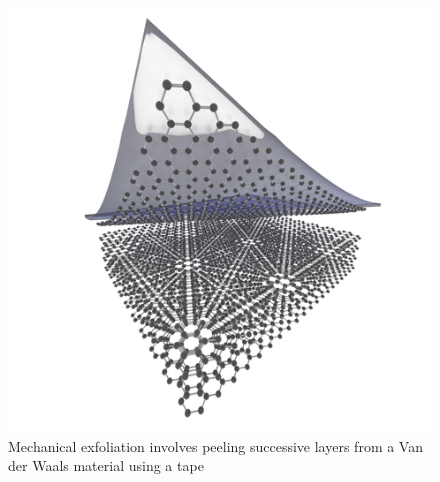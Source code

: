 \documentclass[12pt,a4paper]{report}
\begin{document}
\begin{figure}
  \centering
  \includegraphics[scale=0.3]{2.1.1.png}
  \caption{Mechanical exfoliation involves peeling successive layers from a Van der Waals material using a tape}
  \label{mechexfol}
  \end{figure}
\end{document}
